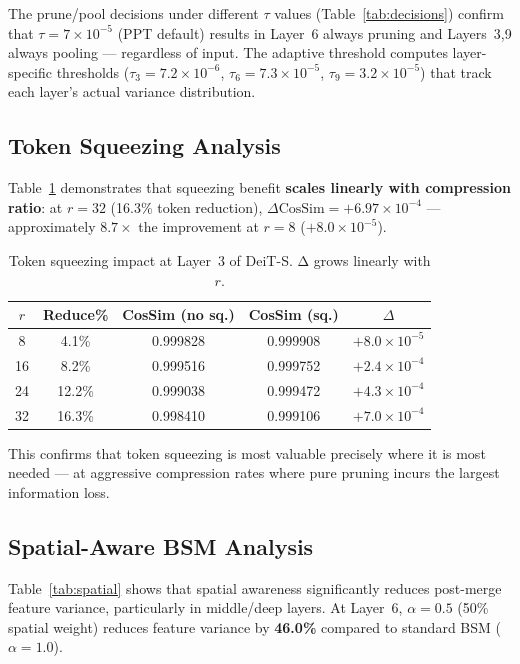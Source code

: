 \documentclass[10pt,twocolumn,letterpaper]{article}
\begin{document}
The prune/pool decisions under different $\tau$ values (Table~\ref{tab:decisions})
confirm that $\tau = 7 \times 10^{-5}$ (PPT default) results in Layer~6 always
pruning and Layers~3,9 always pooling --- regardless of input. The adaptive
threshold computes layer-specific thresholds ($\tau_3 = 7.2\!\times\!10^{-6}$,
$\tau_6 = 7.3\!\times\!10^{-5}$, $\tau_9 = 3.2\!\times\!10^{-5}$) that track
each layer's actual variance distribution.


\subsection{Token Squeezing Analysis}

Table~\ref{tab:squeezing} demonstrates that squeezing benefit \textbf{scales
linearly with compression ratio}: at $r=32$ (16.3\% token reduction),
$\Delta\text{CosSim} = +6.97 \times 10^{-4}$ --- approximately $8.7\times$ the
improvement at $r=8$ ($+8.0 \times 10^{-5}$).

\begin{table}[t]
\centering
\caption{Token squeezing impact at Layer~3 of DeiT-S. Δ grows linearly with $r$.}
\label{tab:squeezing}
\small
\begin{tabular}{ccccc}
\toprule
$r$ & Reduce\% & CosSim (no sq.) & CosSim (sq.) & $\Delta$ \\
\midrule
8  & 4.1\%  & 0.999828 & 0.999908 & $+8.0\!\times\!10^{-5}$ \\
16 & 8.2\%  & 0.999516 & 0.999752 & $+2.4\!\times\!10^{-4}$ \\
24 & 12.2\% & 0.999038 & 0.999472 & $+4.3\!\times\!10^{-4}$ \\
32 & 16.3\% & 0.998410 & 0.999106 & $+7.0\!\times\!10^{-4}$ \\
\bottomrule
\end{tabular}
\end{table}

This confirms that token squeezing is most valuable precisely where it is
most needed --- at aggressive compression rates where pure pruning incurs
the largest information loss.


\subsection{Spatial-Aware BSM Analysis}

Table~\ref{tab:spatial} shows that spatial awareness significantly reduces
post-merge feature variance, particularly in middle/deep layers. At Layer~6,
$\alpha = 0.5$ (50\% spatial weight) reduces feature variance by \textbf{46.0\%}
compared to standard BSM ($\alpha = 1.0$).
\end{document}
